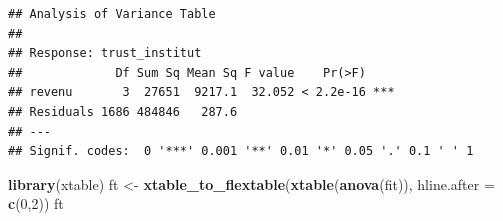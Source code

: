 \documentclass[
]{book}
\newenvironment{Shaded}{\begin{snugshade}}{\end{snugshade}}
\newcommand{\DataTypeTok}[1]{\textcolor[rgb]{0.13,0.29,0.53}{#1}}
\newcommand{\DecValTok}[1]{\textcolor[rgb]{0.00,0.00,0.81}{#1}}
\newcommand{\KeywordTok}[1]{\textcolor[rgb]{0.13,0.29,0.53}{\textbf{#1}}}
\newcommand{\NormalTok}[1]{#1}
\newcommand{\StringTok}[1]{\textcolor[rgb]{0.31,0.60,0.02}{#1}}
\begin{document}
\begin{verbatim}
## Analysis of Variance Table
## 
## Response: trust_institut
##             Df Sum Sq Mean Sq F value    Pr(>F)    
## revenu       3  27651  9217.1  32.052 < 2.2e-16 ***
## Residuals 1686 484846   287.6                      
## ---
## Signif. codes:  0 '***' 0.001 '**' 0.01 '*' 0.05 '.' 0.1 ' ' 1
\end{verbatim}

\begin{Shaded}
\begin{Highlighting}[]
\KeywordTok{library}\NormalTok{(xtable)}
\NormalTok{ft <-}\StringTok{ }\KeywordTok{xtable_to_flextable}\NormalTok{(}\KeywordTok{xtable}\NormalTok{(}\KeywordTok{anova}\NormalTok{(fit)), }\DataTypeTok{hline.after =} \KeywordTok{c}\NormalTok{(}\DecValTok{0}\NormalTok{,}\DecValTok{2}\NormalTok{))}
\NormalTok{ft}
\end{Highlighting}
\end{Shaded}

\providecommand{\docline}[3]{\noalign{\global\setlength{\arrayrulewidth}{#1}}\arrayrulecolor[HTML]{#2}\cline{#3}}

\setlength{\tabcolsep}{2pt}

\renewcommand*{\arraystretch}{1.5}
\end{document}
